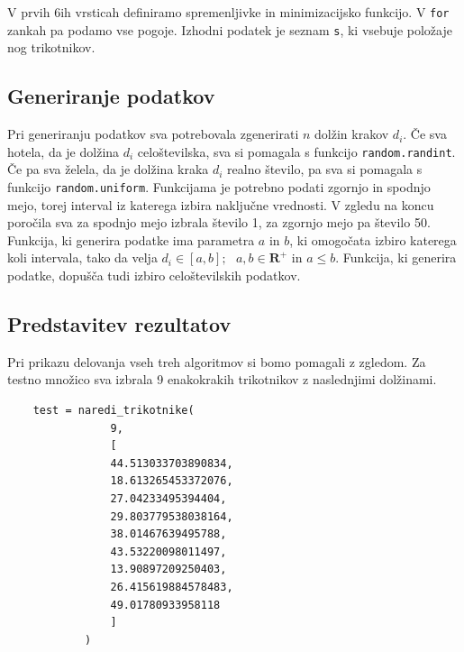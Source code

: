 \documentclass[a4paper,12pt]{article}
\theoremstyle{definition}
\theoremstyle{plain}
\begin{document}
V prvih 6ih vrsticah definiramo spremenljivke in minimizacijsko funkcijo. V \texttt{for} zankah pa podamo vse pogoje.
Izhodni podatek je seznam \texttt{s}, ki vsebuje položaje nog trikotnikov. 

\subsection{Generiranje podatkov}
Pri generiranju podatkov sva potrebovala zgenerirati $n$ dolžin krakov $d_{i}$. Če sva hotela, da je dolžina $d_{i}$
celoštevilska, sva si pomagala s funkcijo \texttt{random.randint}. Če pa sva želela, da je dolžina kraka $d_{i}$ realno število,
pa sva si pomagala s funkcijo \texttt{random.uniform}. Funkcijama je potrebno podati zgornjo in spodnjo mejo, torej interval iz katerega izbira naključne vrednosti.
\newpage
V zgledu na koncu poročila sva za spodnjo mejo izbrala število 1, za
zgornjo mejo pa število 50. 
Funkcija, ki generira podatke ima parametra $a$ in $b$, ki omogočata izbiro katerega koli intervala, tako da velja 
$d_{i} \in [a,b]; \text{ } a, b \in \mathbf{R}^+  \text{ in } a \leq b$. Funkcija, ki generira podatke, dopušča tudi izbiro celoštevilskih podatkov.



\subsection{Predstavitev rezultatov}
Pri prikazu delovanja vseh treh algoritmov si bomo pomagali z zgledom.
Za testno množico sva izbrala 9 enakokrakih trikotnikov z naslednjimi dolžinami.

\begin{verbatim}
    test = naredi_trikotnike(
                9,
                [ 
                44.513033703890834,
                18.613265453372076,
                27.04233495394404,
                29.803779538038164,
                38.01467639495788,
                43.53220098011497,
                13.90897209250403,
                26.415619884578483,
                49.01780933958118
                ]
            )
\end{verbatim}
\end{document}
